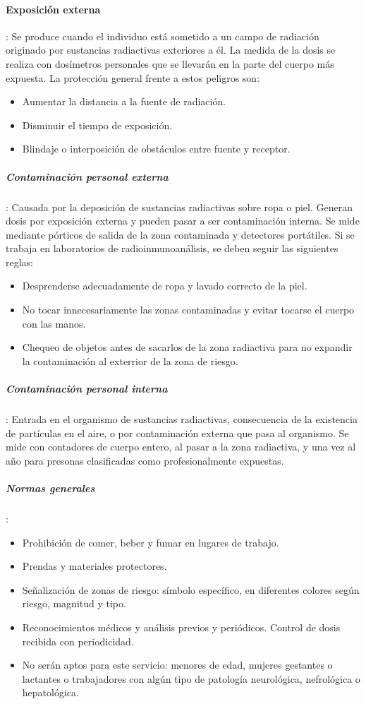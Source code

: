 \paragraph{Exposición externa}: Se produce cuando el individuo está sometido a un campo de radiación originado por sustancias radiactivas exteriores a él. La medida de la dosis se realiza con dosímetros personales que se llevarán en la parte del cuerpo más expuesta. La protección general frente a estos peligros son:
    \begin{itemize}[itemsep=0pt,parsep=0pt,topsep=0pt,partopsep=0pt]
        \item Aumentar la distancia a la fuente de radiación.
        \item Disminuir el tiempo de exposición.
        \item Blindaje o interposición de obstáculos entre fuente y receptor.
    \end{itemize}
    \subparagraph{Contaminación personal externa}: Causada por la deposición de sustancias radiactivas sobre ropa o piel. Generan dosis por exposición externa y pueden pasar a ser contaminación interna. Se mide mediante pórticos de salida de la zona contaminada y detectores portátiles. Si se trabaja en laboratorios de radioinmunoanálisis, se deben seguir las siguientes reglas:
        \begin{itemize}[itemsep=0pt,parsep=0pt,topsep=0pt,partopsep=0pt]
            \item Desprenderse adecuadamente de ropa y lavado correcto de la piel.
            \item No tocar innecesariamente las zonas contaminadas y evitar tocarse el cuerpo con las manos.
            \item Chequeo de objetos antes de sacarlos de la zona radiactiva para no expandir la contaminación al exterrior de la zona de riesgo.
        \end{itemize}
    \subparagraph{Contaminación personal interna}: Entrada en el organismo de sustancias radiactivas, consecuencia de la existencia de partículas en el aire, o por contaminación externa que pasa al organismo. Se mide con contadores de cuerpo entero, al pasar a la zona radiactiva, y una vez al año para presonas clasificadas como profesionalmente expuestas.
    \subparagraph{Normas generales}:
    \begin{itemize}[itemsep=0pt,parsep=0pt,topsep=0pt,partopsep=0pt]
        \item Prohibición de comer, beber y fumar en lugares de trabajo.
        \item Prendas y materiales protectores.
        \item Señalización de zonas de riesgo: símbolo específico, en diferentes colores según riesgo, magnitud y tipo.
        \item Reconocimientos médicos y análisis previos y periódicos. Control de dosis recibida con periodicidad.
        \item No serán aptos para este servicio: menores de edad, mujeres gestantes o lactantes o trabajadores con algún tipo de patología neurológica, nefrológica o hepatológica.
    \end{itemize}







